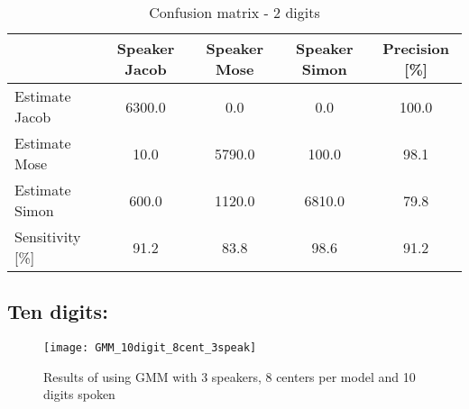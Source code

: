 \begin{table}[H]                                              
\centering                                                     
\begin{tabular}{|l|c|c|c|c|}                                   
\hline                                                         
  & Speaker Jacob & Speaker Mose & Speaker Simon & Precision [\%] \\
\hline                                                         
Estimate Jacob & 6300.0 & 0.0 & 0.0 & 100.0 \\                 
\hline                                                         
Estimate Mose & 10.0 & 5790.0 & 100.0 & 98.1 \\                
\hline                                                         
Estimate Simon & 600.0 & 1120.0 & 6810.0 & 79.8 \\             
\hline                                                         
Sensitivity [\%] & 91.2 & 83.8 & 98.6 & 91.2 \\                
\hline                                                         
\end{tabular}                                                  
\caption{Confusion matrix - 2 digits}                          
\label{table:GMM_conf_2}                                       
\end{table} 


\subsection{Ten digits:}

\begin{figure}[H]
\centering
\texttt{[image: GMM\_10digit\_8cent\_3speak]}
\caption{Results of using GMM with 3 speakers, 8 centers per model and 10 digits spoken}
\label{fig:GMM_fig_10}
\end{figure}

